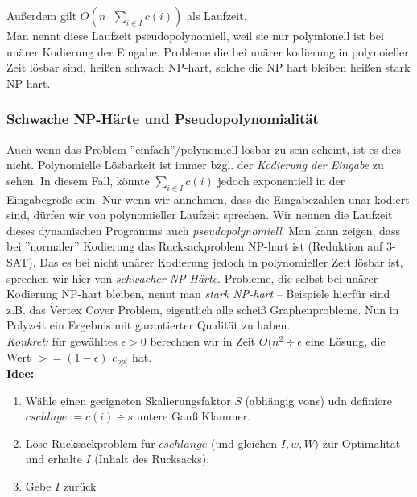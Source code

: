 \documentclass{article}
\begin{document}
Außerdem gilt $O(n \cdot \sum_{i \in I} c(i))$ als Laufzeit.\\

Man nennt diese Laufzeit pseudopolynomiell, weil sie nur polymionell ist bei unärer Kodierung der Eingabe.
Probleme die bei unärer kodierung in polynoieller Zeit lösbar sind, heißen schwach NP-hart, solche die NP hart bleiben
heißen stark NP-hart.\\

\subsubsection{Schwache NP-Härte und Pseudopolynomialität}
Auch wenn das Problem ''einfach''/polynomiell lösbar zu sein scheint, ist es dies nicht. Polynomielle Lösbarkeit ist immer bzgl. der \emph{Kodierung der Eingabe} zu sehen. In diesem Fall, könnte $\sum_{i\in I} c(i)$ jedoch exponentiell in der Eingabegröße sein. Nur wenn wir annehmen, dass die Eingabezahlen unär kodiert sind, dürfen wir von polynomieller Laufzeit sprechen. Wir nennen die Laufzeit dieses dynamischen Programms auch \emph{pseudopolynomiell}. Man kann zeigen, dass bei ''normaler'' Kodierung das Rucksackproblem NP-hart ist (Reduktion auf 3-SAT). Das es bei nicht unärer Kodierung jedoch in polynomieller Zeit lösbar ist, sprechen wir hier von \emph{schwacher NP-Härte}. Probleme, die selbst bei unärer Kodierung NP-hart bleiben, nennt man \emph{stark NP-hart} -- Beispiele hierfür sind z.B. das Vertex Cover Problem, eigentlich alle scheiß Graphenprobleme.
\newline
Nun in Polyzeit ein Ergebnis mit garantierter Qualität zu haben. \\
\textit{Konkret: } für gewähltes $\epsilon > 0$ berechnen wir in Zeit $O(n^2\div \epsilon$ eine Lösung, die Wert $ > = (1- \epsilon)$ $c_{opt}$ hat.  \\
\textbf{Idee: } 
\begin{enumerate}
    \item Wähle einen geeigneten Skalierungsfaktor $S$ (abhängig von$ \epsilon$) udn definiere $ c schlage:= c(i) \div s$ untere Gauß Klammer.
    \item Löse Rucksackproblem für $cschlange$ (und gleichen $I, w,W)$ zur Optimalität und erhalte $I$ (Inhalt des Rucksacks).
    \item Gebe $I$ zurück
\end{enumerate}
\end{document}
